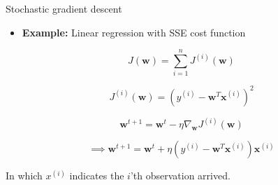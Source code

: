 \documentclass[serif, aspectratio=169]{beamer}
\begin{document}
\begin{frame}{Stochastic gradient descent}

    \begin{itemize}
        \item \textbf{Example:} Linear regression with SSE cost function
    \end{itemize}
    \[
    J(\mathbf{w}) = \sum_{i=1}^{n} J^{(i)}(\mathbf{w})
    \]
    
    \[
    J^{(i)}(\mathbf{w}) = \left( y^{(i)} - \mathbf{w}^T \mathbf{x}^{(i)} \right)^2
    \]
    
    \[
    \mathbf{w}^{t+1} = \mathbf{w}^t - \eta \nabla_{\mathbf{w}} J^{(i)}(\mathbf{w})
    \]
    
    \[
    \implies \mathbf{w}^{t+1} = \mathbf{w}^t + \eta \left( y^{(i)} - \mathbf{w}^T \mathbf{x}^{(i)} \right) \mathbf{x}^{(i)}
    \]
    
    \begin{center}
        In which \( x^{(i)} \) indicates the \(i\)'th observation arrived.
    \end{center}
    
\end{frame}


\end{document}
